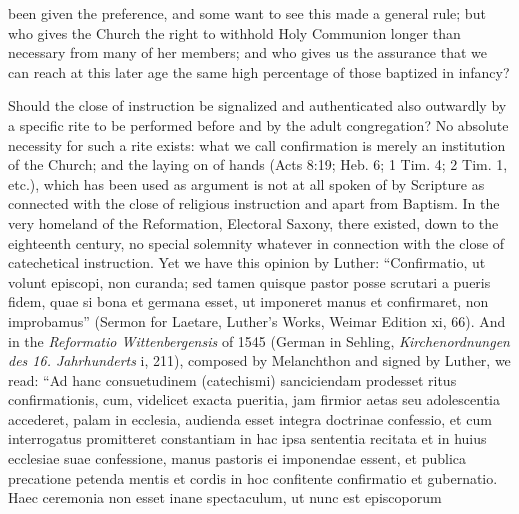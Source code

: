 been given the preference, and some want to see this made a general rule; but who gives the Church the right to withhold Holy Communion longer than necessary from many of her members; and who gives us the assurance that we can reach at this later age the same high percentage of those baptized in infancy?

Should the close of instruction be signalized and authenticated also outwardly by a specific rite to be performed before and by the adult congregation? No absolute necessity for such a rite exists: what we call confirmation is merely an institution of the Church; and the laying on of hands (Acts 8:19; Heb. 6; 1 Tim. 4; 2 Tim. 1, etc.), which has been used as argument is not at all spoken of by Scripture as connected with the close of religious instruction and apart from Baptism. In the very homeland of the Reformation, Electoral Saxony, there existed, down to the eighteenth century, no special solemnity whatever in connection with the close of catechetical instruction. Yet we have this opinion by Luther: “Confirmatio, ut volunt episcopi, non curanda; sed tamen quisque pastor posse scrutari a pueris fidem, quae si bona et germana esset, ut imponeret manus et confirmaret, non improbamus” (Sermon for Laetare, Luther’s Works, Weimar Edition xi, 66). And in the \emph{Reformatio Wittenbergensis} of 1545 (German in Sehling, \emph{Kirchenordnungen des 16. Jahrhunderts} i, 211), composed by Melanchthon and signed by Luther, we read: “Ad hanc consuetudinem (catechismi) sanciciendam prodesset ritus confirmationis, cum, videlicet exacta pueritia, jam firmior aetas seu adolescentia accederet, palam in ecclesia, audienda esset integra doctrinae confessio, et cum interrogatus promitteret constantiam in hac ipsa sententia recitata et in huius ecclesiae suae confessione, manus pastoris ei imponendae essent, et publica precatione petenda mentis et cordis in hoc confitente confirmatio et gubernatio. Haec ceremonia non esset inane spectaculum, ut nunc est episcoporum
